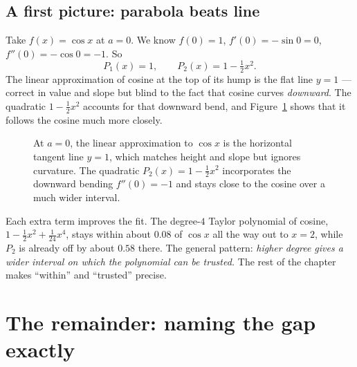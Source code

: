 \subsection{A first picture: parabola beats line}
Take $f(x) = \cos x$ at $a = 0$. We know $f(0)=1$, $f'(0) = -\sin 0 = 0$,
$f''(0) = -\cos 0 = -1$. So
\[
  P_1(x) = 1, \qquad P_2(x) = 1 - \tfrac{1}{2}x^2.
\]
The linear approximation of cosine at the top of its hump is the flat line
$y=1$ --- correct in value and slope but blind to the fact that cosine curves
\emph{downward}. The quadratic $1 - \tfrac{1}{2}x^2$ accounts for that downward bend,
and Figure~\ref{ch31:fig-cos-parabola} shows that it follows the cosine much more closely.
\begin{figure}[H]
\centering
{}
\caption{At $a=0$, the linear approximation to $\cos x$ is the horizontal tangent line $y=1$,
which matches height and slope but ignores curvature. The quadratic $P_2(x)=1-\tfrac12 x^2$
incorporates the downward bending $f''(0)=-1$ and stays close to the cosine over a much wider interval.}
\label{ch31:fig-cos-parabola}
\end{figure}

Each extra term improves the fit. The degree-$4$ Taylor polynomial of cosine,
$1 - \tfrac12 x^2 + \tfrac{1}{24}x^4$, stays within about $0.08$ of $\cos x$ all the
way out to $x=2$, while $P_2$ is already off by about $0.58$ there. The general
pattern: \emph{higher degree gives a wider interval on which the polynomial can be
trusted.} The rest of the chapter makes ``within'' and ``trusted'' precise.

\section{The remainder: naming the gap exactly}

